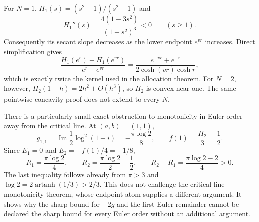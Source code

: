 For $N=1$, $H_1(s)=(s^2-1)/(s^2+1)$ and
\[
 H_1''(s)=\frac{4(1-3s^2)}{(1+s^2)^3}<0\qquad(s\ge1).
\]
Consequently its secant slope decreases as the lower endpoint $e^{vr}$
increases. Direct simplification gives
\[
 \frac{H_1(e^r)-H_1(e^{vr})}{e^r-e^{vr}}
 =\frac{e^{-vr}+e^{-r}}{2\cosh(vr)\cosh r},
\]
which is exactly twice the kernel used in the allocation theorem.
For $N=2$, however, $H_2(1+h)=2h^2+O(h^3)$, so $H_2$ is convex near
one. The same pointwise concavity proof does not extend to every $N$.

There is a particularly small exact obstruction to monotonicity in Euler
order away from the critical line. At $(a,b)=(1,1)$,
\[
 g_{1,1}=\operatorname{Im}\frac12\log^2(1-i)
       =-\frac{\pi\log2}{8},\qquad f(1)=\frac{H_2}{3}=\frac12.
\]
Since $E_1=0$ and $E_2=-f(1)/4=-1/8$,
\[
 R_1=\frac{\pi\log2}{4},\qquad
 R_2=\frac{\pi\log2}{2}-\frac12,
 \qquad R_2-R_1=\frac{\pi\log2-2}{4}>0.
\]
The last inequality follows already from $\pi>3$ and
$\log2=2\operatorname{artanh}(1/3)>2/3$.
This does not challenge the critical-line monotonicity theorem, whose
endpoint atom supplies a different argument. It shows why the sharp
bound for $-2g$ and the first Euler remainder cannot be declared the
sharp bound for every Euler order without an additional argument.
